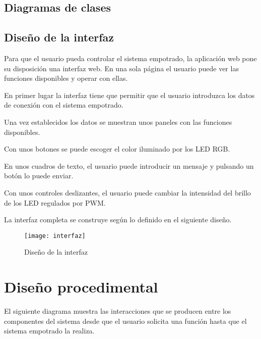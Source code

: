 \subsection{Diagramas de clases} \label{sec:design-comp}




\subsection{Diseño de la interfaz} \label{sec:design-iface}
Para que el usuario pueda controlar el sistema empotrado, la aplicación web
pone su disposición una interfaz web. En una sola página el usuario puede
ver las funciones disponibles y operar con ellas.

En primer lugar la interfaz tiene que permitir que el usuario introduzca
los datos de conexión con el sistema empotrado.


Una vez establecidos los datos se muestran unos paneles con las funciones
disponibles.

Con unos botones se puede escoger el color iluminado por los LED RGB.


En unos cuadros de texto, el usuario puede introducir un mensaje y pulsando
un botón lo puede enviar.

\clearpage

Con unos controles deslizantes, el usuario puede cambiar la intensidad del brillo
de los LED regulados por PWM.

\clearpage

La interfaz completa se construye según lo definido en el siguiente diseño.

\begin{figure}[H]
  \centering
  \texttt{[image: interfaz]}
  \caption{Diseño de la interfaz} \label{fig:intefaz}
\end{figure}

\clearpage

\section{Diseño procedimental} \label{sec:design-proc}
El siguiente diagrama muestra las interacciones que se producen entre
los componentes del sistema desde que el usuario solicita una función hasta que
el sistema empotrado la realiza.


